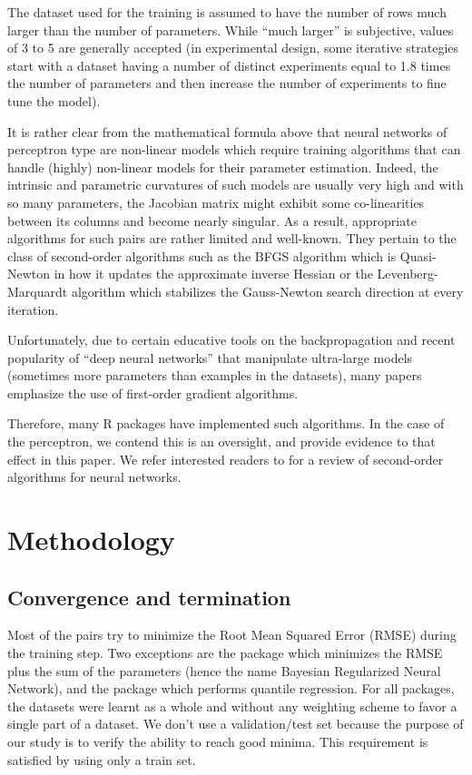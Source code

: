 The dataset used for the training is assumed to have the number of rows
much larger than the number of parameters. While ``much larger'' is
subjective, values of 3 to 5 are generally accepted (in experimental
design, some iterative strategies start with a dataset having a number
of distinct experiments equal to 1.8 times the number of parameters and
then increase the number of experiments to fine tune the model).

It is rather clear from the mathematical formula above that neural
networks of perceptron type are non-linear models which require training
algorithms that can handle (highly) non-linear models for their
parameter estimation. Indeed, the intrinsic and parametric curvatures of
such models are usually very high and with so many parameters, the
Jacobian matrix might exhibit some co-linearities between its columns
and become nearly singular. As a result, appropriate algorithms for such
 pairs are rather limited and well-known. They
pertain to the class of second-order algorithms such as the BFGS
algorithm which is Quasi-Newton in how it updates the approximate
inverse Hessian or the Levenberg-Marquardt algorithm which stabilizes
the Gauss-Newton search direction at every iteration.

Unfortunately, due to certain educative tools on the backpropagation and
recent popularity of ``deep neural networks'' that manipulate
ultra-large models (sometimes more parameters than examples in the
datasets), many papers emphasize the use of first-order gradient
algorithms.

Therefore, many R packages have implemented such algorithms. In the case
of the perceptron, we contend this is an oversight, and provide evidence
to that effect in this paper. We refer interested readers to
\citep{tan2019review} for a review of second-order algorithms for neural
networks.

\hypertarget{methodology}{%
\section{Methodology}\label{methodology}}

\hypertarget{convergence-and-termination}{%
\subsection{Convergence and
termination}\label{convergence-and-termination}}

Most of the  pairs try to minimize the Root Mean
Squared Error (RMSE) during the training step. Two exceptions are the
 package which minimizes the RMSE plus the sum of the
parameters (hence the name Bayesian Regularized Neural Network), and the
 package which performs quantile regression. For all
packages, the datasets were learnt as a whole and without any weighting
scheme to favor a single part of a dataset. We don't use a
validation/test set because the purpose of our study is to verify the
ability to reach good minima. This requirement is satisfied by using
only a train set.

